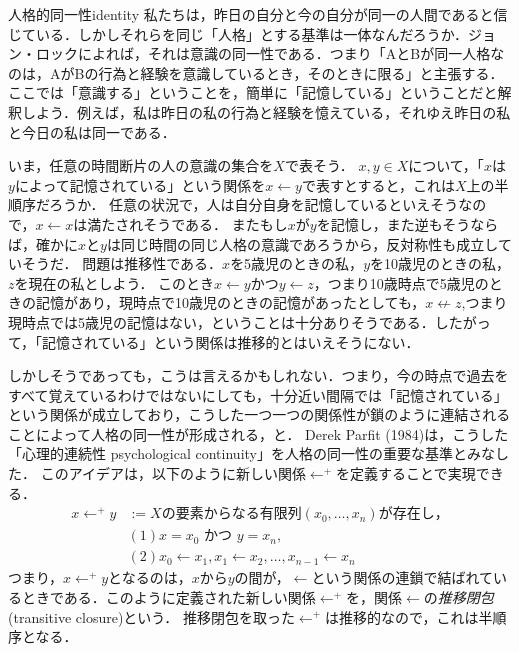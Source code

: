 \documentclass[dvipdfmx,11pt,a4paper]{jsarticle}
\begin{document}
\begin{rei}{人格的同一性}{identity}
私たちは，昨日の自分と今の自分が同一の人間であると信じている．しかしそれらを同じ「人格」とする基準は一体なんだろうか．ジョン・ロックによれば，それは意識の同一性である．つまり「AとBが同一人格なのは，AがBの行為と経験を意識しているとき，そのときに限る」と主張する．
ここでは「意識する」ということを，簡単に「記憶している」ということだと解釈しよう．例えば，私は昨日の私の行為と経験を憶えている，それゆえ昨日の私と今日の私は同一である．

いま，任意の時間断片の人の意識の集合を$X$で表そう．
$x, y \in X$について，「$x$は$y$によって記憶されている」という関係を$x \leftarrow y$で表すとすると，これは$X$上の半順序だろうか．
任意の状況で，人は自分自身を記憶しているといえそうなので，$x \leftarrow x$は満たされそうである．
またもし$x$が$y$を記憶し，また逆もそうならば，確かに$x$と$y$は同じ時間の同じ人格の意識であろうから，反対称性も成立していそうだ．
問題は推移性である．$x$を5歳児のときの私，$y$を10歳児のときの私，$z$を現在の私としよう．
このとき$x \leftarrow y$かつ$y \leftarrow z$，つまり10歳時点で5歳児のときの記憶があり，現時点で10歳児のときの記憶があったとしても，$x \not\leftarrow z$,つまり現時点では5歳児の記憶はない，ということは十分ありそうである．したがって，「記憶されている」という関係は推移的とはいえそうにない．

しかしそうであっても，こうは言えるかもしれない．つまり，今の時点で過去をすべて覚えているわけではないにしても，十分近い間隔では「記憶されている」という関係が成立しており，こうした一つ一つの関係性が鎖のように連結されることによって人格の同一性が形成される，と．
Derek Parfit (1984)は，こうした「心理的連続性 psychological continuity」を人格の同一性の重要な基準とみなした．
このアイデアは，以下のように新しい関係$\leftarrow^{+}$を定義することで実現できる．
\begin{align*}
 x \leftarrow^{+} y 
 &:= X \text{の要素からなる有限列} (x_0, \dots, x_n) \text{が存在し，} \\
 & (1) x = x_0 \text{ かつ } y = x_n, \\
 & (2) x_0 \leftarrow x_1, x_1 \leftarrow x_2, \dots, x_{n-1} \leftarrow x_n
\end{align*}
つまり，$x \leftarrow^{+} y$となるのは，$x$から$y$の間が，$\leftarrow$という関係の連鎖で結ばれているときである．このように定義された新しい関係$\leftarrow^{+}$を，関係$\leftarrow$の\emph{推移閉包}(transitive closure)という．
推移閉包を取った$\leftarrow^{+}$は推移的なので，これは半順序となる．
\end{rei}  
\end{document}
